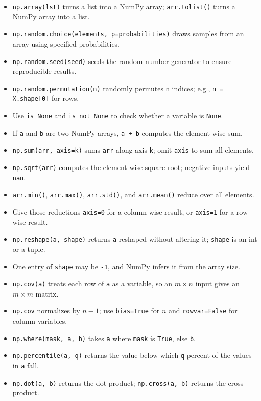 \documentclass{article}
\begin{document}
\begin{itemize}
    \item \texttt{np.array(lst)} turns a list into a NumPy array; \texttt{arr.tolist()} turns a NumPy array into a list.
    \item \texttt{np.random.choice(elements, p=probabilities)} draws samples from an array using specified probabilities.
    \item \texttt{np.random.seed(seed)} seeds the random number generator to ensure reproducible results.
    \item \texttt{np.random.permutation(n)} randomly permutes \texttt{n} indices; e.g., \texttt{n = X.shape[0]} for rows.
    \item Use \texttt{is None} and \texttt{is not None} to check whether a variable is \texttt{None}.
    \item If \texttt{a} and \texttt{b} are two NumPy arrays, \texttt{a + b} computes the element-wise sum.
    \item \texttt{np.sum(arr, axis=k)} sums \texttt{arr} along axis \texttt{k}; omit \texttt{axis} to sum all elements.
    \item \texttt{np.sqrt(arr)} computes the element-wise square root; negative inputs yield \texttt{nan}.
    \item \texttt{arr.min()}, \texttt{arr.max()}, \texttt{arr.std()}, and \texttt{arr.mean()} reduce over all elements.
    \item Give those reductions \texttt{axis=0} for a column-wise result, or \texttt{axis=1} for a row-wise result.
    \item \texttt{np.reshape(a, shape)} returns \texttt{a} reshaped without altering it; \texttt{shape} is an int or a tuple.
    \item One entry of \texttt{shape} may be \texttt{-1}, and NumPy infers it from the array size.
    \item \texttt{np.cov(a)} treats each row of \texttt{a} as a variable, so an $m \times n$ input gives an $m \times m$ matrix.
    \item \texttt{np.cov} normalizes by $n-1$; use \texttt{bias=True} for $n$ and \texttt{rowvar=False} for column variables.
    \item \texttt{np.where(mask, a, b)} takes \texttt{a} where \texttt{mask} is \texttt{True}, else \texttt{b}.
    \item \texttt{np.percentile(a, q)} returns the value below which \texttt{q} percent of the values in \texttt{a} fall.
    \item \texttt{np.dot(a, b)} returns the dot product; \texttt{np.cross(a, b)} returns the cross product.

\end{itemize}
\end{document}

